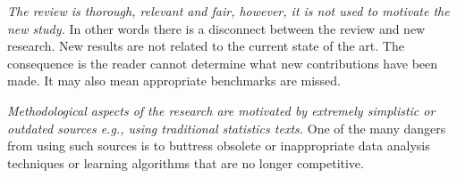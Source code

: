 \documentclass[preprint,10pt]{elsarticle}
\begin{document}
{\em The review is thorough, relevant and fair, however, it is not used to motivate the new study. } In other words there is a disconnect between the review  and new research. New results are not related to the current state of the art.  The consequence is the reader cannot determine what new contributions have been made.  It may also mean appropriate benchmarks are missed.

{\em Methodological aspects of the research are motivated by extremely simplistic or outdated sources e.g., using traditional statistics texts. }  One of the many dangers from using such sources is to buttress obsolete or inappropriate data analysis techniques or learning algorithms that are no longer competitive.





 
 

% 
\end{document}
